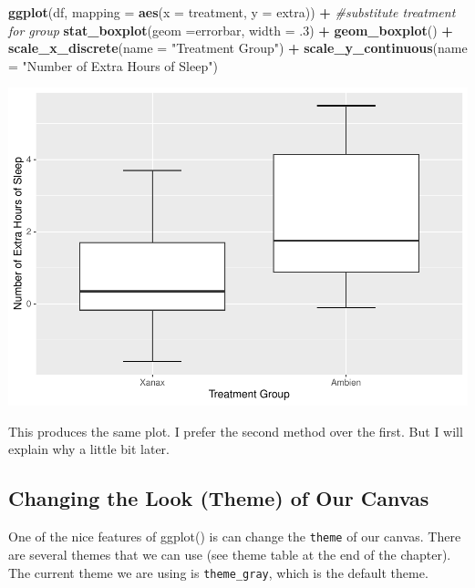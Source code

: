 \documentclass[
]{book}
\newenvironment{Shaded}{\begin{snugshade}}{\end{snugshade}}
\newcommand{\AttributeTok}[1]{\textcolor[rgb]{0.13,0.29,0.53}{#1}}
\newcommand{\CommentTok}[1]{\textcolor[rgb]{0.56,0.35,0.01}{\textit{#1}}}
\newcommand{\DecValTok}[1]{\textcolor[rgb]{0.00,0.00,0.81}{#1}}
\newcommand{\FunctionTok}[1]{\textcolor[rgb]{0.13,0.29,0.53}{\textbf{#1}}}
\newcommand{\NormalTok}[1]{#1}
\newcommand{\SpecialCharTok}[1]{\textcolor[rgb]{0.81,0.36,0.00}{\textbf{#1}}}
\newcommand{\StringTok}[1]{\textcolor[rgb]{0.31,0.60,0.02}{#1}}
\begin{document}
\begin{Shaded}
\begin{Highlighting}[]
\FunctionTok{ggplot}\NormalTok{(df, }\AttributeTok{mapping =} \FunctionTok{aes}\NormalTok{(}\AttributeTok{x =}\NormalTok{ treatment, }\AttributeTok{y =}\NormalTok{ extra)) }\SpecialCharTok{+} \CommentTok{\#substitute treatment for group}
  \FunctionTok{stat\_boxplot}\NormalTok{(}\AttributeTok{geom =}\StringTok{\textquotesingle{}errorbar\textquotesingle{}}\NormalTok{, }\AttributeTok{width =}\NormalTok{ .}\DecValTok{3}\NormalTok{) }\SpecialCharTok{+}
  \FunctionTok{geom\_boxplot}\NormalTok{() }\SpecialCharTok{+} 
  \FunctionTok{scale\_x\_discrete}\NormalTok{(}\AttributeTok{name =} \StringTok{"Treatment Group"}\NormalTok{) }\SpecialCharTok{+} 
  \FunctionTok{scale\_y\_continuous}\NormalTok{(}\AttributeTok{name =} \StringTok{"Number of Extra Hours of Sleep"}\NormalTok{)}
\end{Highlighting}
\end{Shaded}

\includegraphics{rintro_demo_files/figure-latex/unnamed-chunk-286-1.pdf}

This produces the same plot. I prefer the second method over the first. But I will explain why a little bit later.

\hypertarget{changing-the-look-theme-of-our-canvas}{%
\subsection{Changing the Look (Theme) of Our Canvas}\label{changing-the-look-theme-of-our-canvas}}

One of the nice features of ggplot() is can change the \texttt{theme} of our canvas. There are several themes that we can use (see theme table at the end of the chapter). The current theme we are using is \texttt{theme\_gray}, which is the default theme.
\end{document}
